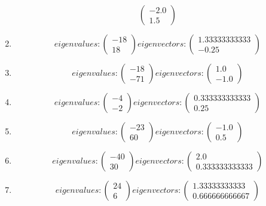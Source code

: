 \documentclass{article}%
\begin{document}
\begin{enumerate}[label=\arabic*)]
\[\begin{pmatrix}
-2.0\\%
1.5%
\end{pmatrix}%
\]%
\item%
\[%
eigenvalues: \begin{pmatrix}%
-18\\%
18%
\end{pmatrix} eigenvectors: \begin{pmatrix}%
1.33333333333\\%
-0.25%
\end{pmatrix}%
\]%
\item%
\[%
eigenvalues: \begin{pmatrix}%
-18\\%
-71%
\end{pmatrix} eigenvectors: \begin{pmatrix}%
1.0\\%
-1.0%
\end{pmatrix}%
\]%
\item%
\[%
eigenvalues: \begin{pmatrix}%
-4\\%
-2%
\end{pmatrix} eigenvectors: \begin{pmatrix}%
0.333333333333\\%
0.25%
\end{pmatrix}%
\]%
\item%
\[%
eigenvalues: \begin{pmatrix}%
-23\\%
60%
\end{pmatrix} eigenvectors: \begin{pmatrix}%
-1.0\\%
0.5%
\end{pmatrix}%
\]%
\item%
\[%
eigenvalues: \begin{pmatrix}%
-40\\%
30%
\end{pmatrix} eigenvectors: \begin{pmatrix}%
2.0\\%
0.333333333333%
\end{pmatrix}%
\]%
\item%
\[%
eigenvalues: \begin{pmatrix}%
24\\%
6%
\end{pmatrix} eigenvectors: \begin{pmatrix}%
1.33333333333\\%
0.666666666667%
\end{pmatrix}%
\]
\end{enumerate}
\end{document}

